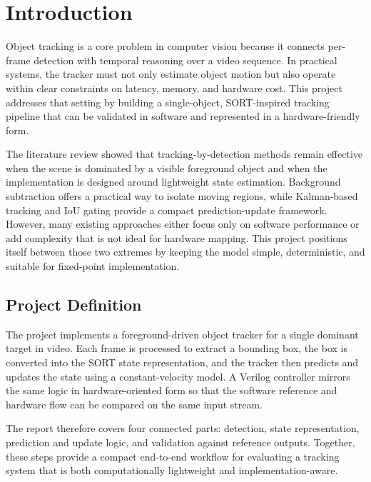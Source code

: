 \chapter{Introduction} \label{section:introduction}

Object tracking is a core problem in computer vision because it connects per-frame detection 
with temporal reasoning over a video sequence. In practical systems, the tracker must not only 
estimate object motion but also operate within clear constraints on latency, memory, and hardware 
cost. This project addresses that setting by building a single-object, SORT-inspired tracking 
pipeline that can be validated in software and represented in a hardware-friendly form.

The literature review showed that tracking-by-detection methods remain effective when the scene 
is dominated by a visible foreground object and when the implementation is designed around 
lightweight state estimation. Background subtraction offers a practical way to isolate moving 
regions, while Kalman-based tracking and IoU gating provide a compact prediction-update framework. 
However, many existing approaches either focus only on software performance or add complexity that 
is not ideal for hardware mapping. This project positions itself between those two extremes by 
keeping the model simple, deterministic, and suitable for fixed-point implementation.

\section{Project Definition}
\label{section:proj_def}
The project implements a foreground-driven object tracker for a single dominant target in video. 
Each frame is processed to extract a bounding box, the box is converted into the SORT state 
representation, and the tracker then predicts and updates the state using a constant-velocity 
model. A Verilog controller mirrors the same logic in hardware-oriented form so that the software 
reference and hardware flow can be compared on the same input stream.

The report therefore covers four connected parts: detection, state representation, prediction and 
update logic, and validation against reference outputs. Together, these steps provide a compact 
end-to-end workflow for evaluating a tracking system that is both computationally lightweight and 
implementation-aware.

